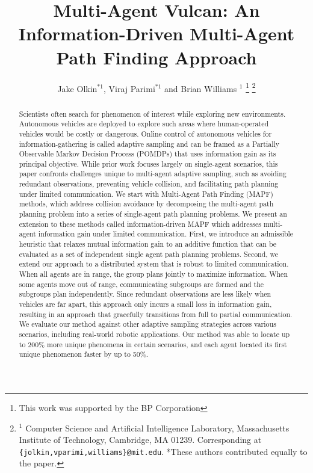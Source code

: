 \documentclass[letterpaper, 10 pt, conference]{IEEEConference}
\title{\LARGE \bf
Multi-Agent Vulcan: An Information-Driven Multi-Agent Path Finding Approach
}
\author{Jake Olkin$^{*1}$, Viraj Parimi$^{*1}$ and Brian Williams $^{1}$%
\thanks{This work was supported by the BP Corporation}%
\thanks{$^{1}$ Computer Science and Artificial Intelligence Laboratory, Massachusetts Institute of Technology, Cambridge, MA 01239. Corresponding at {\tt\footnotesize \{jolkin,vparimi,williams\}@mit.edu}. *These authors contributed equally to the paper.}%
}
\begin{document}
\maketitle
\thispagestyle{empty}
\pagestyle{empty}

\begin{abstract}
Scientists often search for phenomenon of interest while exploring new environments. Autonomous vehicles are deployed to explore such areas where human-operated vehicles would be costly or dangerous. Online control of autonomous vehicles for information-gathering is called adaptive sampling and can be framed as a Partially Observable Markov Decision Process (POMDPs) that uses information gain as its principal objective. While prior work focuses largely on single-agent scenarios, this paper confronts challenges unique to multi-agent adaptive sampling, such as avoiding redundant observations, preventing vehicle collision, and facilitating path planning under limited communication. We start with Multi-Agent Path Finding (MAPF) methods, which address collision avoidance by decomposing the multi-agent path planning problem into a series of single-agent path planning problems. We present an extension to these methods called information-driven MAPF which addresses multi-agent information gain under limited communication. First, we introduce an admissible heuristic that relaxes mutual information gain to an additive function that can be evaluated as a set of independent single agent path planning problems. Second, we extend our approach to a distributed system that is robust to limited communication. When all agents are in range, the group plans jointly to maximize information. When some agents move out of range, communicating subgroups are formed and the subgroups plan independently. Since redundant observations are less likely when vehicles are far apart, this approach only incurs a small loss in information gain, resulting in an approach that gracefully transitions from full to partial communication. We evaluate our method against other adaptive sampling strategies across various scenarios, including real-world robotic applications. Our method was able to locate up to 200\% more unique phenomena in certain scenarios, and each agent located its first unique phenomenon faster by up to 50\%.

% 




\end{abstract}
\end{document}
